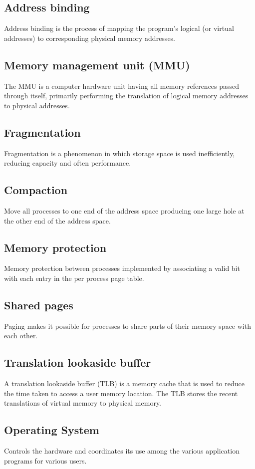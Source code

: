 \subsection{Address binding}
Address binding is the process of mapping
the program's logical (or virtual addresses)
to corresponding physical memory
addresses.

\subsection{Memory management unit (MMU)}
 The MMU is a computer hardware unit having
all memory references passed through itself,
primarily performing the translation of logical
memory addresses to physical addresses.

\subsection{Fragmentation}
Fragmentation is a phenomenon in which
storage space is used inefficiently, reducing
capacity and often performance.

\subsection{Compaction}
Move all processes to one end of the address
space producing one large hole at the other
end of the address space.

\subsection{Memory protection}
Memory protection between
processes implemented by
associating a valid bit with each
entry in the per process page table.

\subsection{Shared pages}
Paging makes it possible for
processes to share parts of their
memory space with each other.

\subsection{Translation lookaside buffer}
A translation lookaside buffer (TLB) is a
memory cache that is used to reduce the time
taken to access a user memory location.
The TLB stores the recent translations of virtual memory to physical memory.

\subsection{Operating System}
Controls the hardware and
coordinates its use among the
various application programs for various users.

